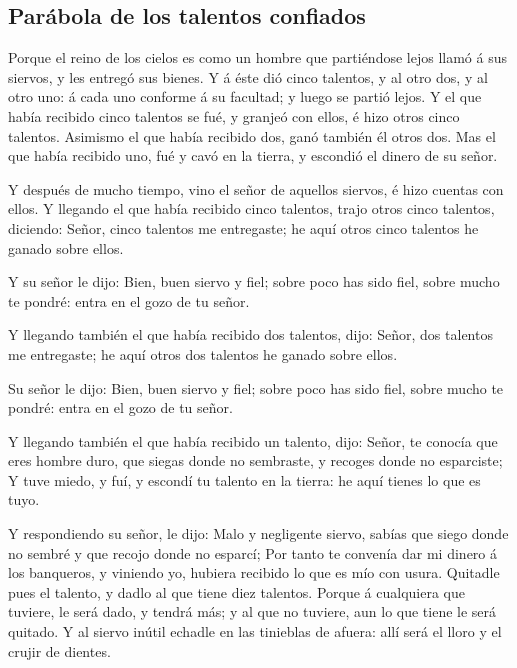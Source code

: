 \hypertarget{paruxe1bola-de-los-talentos-confiados}{%
\subsection{Parábola de los talentos
confiados}\label{paruxe1bola-de-los-talentos-confiados}}

 Porque el reino de los cielos es como un hombre que
partiéndose lejos llamó á sus siervos, y les entregó sus bienes.
 Y á éste dió cinco talentos, y al otro dos, y al otro
uno: á cada uno conforme á su facultad; y luego se partió lejos.
 Y el que había recibido cinco talentos se fué, y granjeó
con ellos, é hizo otros cinco talentos.  Asimismo el que
había recibido dos, ganó también él otros dos.  Mas el
que había recibido uno, fué y cavó en la tierra, y escondió el dinero de
su señor.

 Y después de mucho tiempo, vino el señor de aquellos
siervos, é hizo cuentas con ellos.  Y llegando el que
había recibido cinco talentos, trajo otros cinco talentos, diciendo:
Señor, cinco talentos me entregaste; he aquí otros cinco talentos he
ganado sobre ellos.

 Y su señor le dijo: Bien, buen siervo y fiel; sobre poco
has sido fiel, sobre mucho te pondré: entra en el gozo de tu señor.

 Y llegando también el que había recibido dos talentos,
dijo: Señor, dos talentos me entregaste; he aquí otros dos talentos he
ganado sobre ellos.

 Su señor le dijo: Bien, buen siervo y fiel; sobre poco
has sido fiel, sobre mucho te pondré: entra en el gozo de tu señor.

 Y llegando también el que había recibido un talento,
dijo: Señor, te conocía que eres hombre duro, que siegas donde no
sembraste, y recoges donde no esparciste;  Y tuve miedo,
y fuí, y escondí tu talento en la tierra: he aquí tienes lo que es tuyo.

 Y respondiendo su señor, le dijo: Malo y negligente
siervo, sabías que siego donde no sembré y que recojo donde no esparcí;
 Por tanto te convenía dar mi dinero á los banqueros, y
viniendo yo, hubiera recibido lo que es mío con usura. 
Quitadle pues el talento, y dadlo al que tiene diez talentos.
 Porque á cualquiera que tuviere, le será dado, y tendrá
más; y al que no tuviere, aun lo que tiene le será quitado.
 Y al siervo inútil echadle en las tinieblas de afuera:
allí será el lloro y el crujir de dientes.


